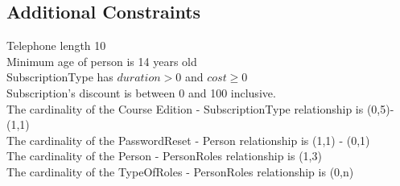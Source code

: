 \subsection{Additional Constraints}
Telephone length 10\\
Minimum age of person is 14 years old\\
SubscriptionType has $duration > 0$ and $cost \ge 0$\\
Subscription's discount is between 0 and 100 inclusive.\\
The cardinality of the Course Edition - SubscriptionType relationship is (0,5)-(1,1)\\
The cardinality of the PasswordReset - Person relationship is (1,1) - (0,1) \\
The cardinality of the Person - PersonRoles relationship is (1,3) \\
The cardinality of the TypeOfRoles - PersonRoles relationship is (0,n) \\